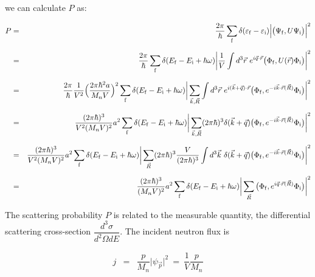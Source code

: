 \documentclass[a4j]{jsarticle}
\begin{document}
we can calculate $P$ as:

\begin{eqnarray}
	P
	&=&
	\dfrac{2 \pi}{\hbar}
	\sum_{\rm f}
	\delta( \varepsilon_{\rm f} - \varepsilon_{\rm i} )
	\Big| \big( \Psi_{\rm f} , U \Psi_{\rm i} \big) \Big|^{2}
	\nonumber \\[2mm] &=&
	\dfrac{2 \pi}{\hbar}
	\sum_{\rm f}
	\delta( E_{\rm f} - E_{\rm i} + \hbar \omega )
	\bigg|
	\dfrac{1}{V} \int d^{3} \vec{r} \
	e^{i \vec{q} \cdot \vec{r}}
	\big( \Phi_{\rm f} , U(\vec{r}) \Phi_{\rm i} \big)
	\bigg|^{2}
	\nonumber \\[2mm] &=&
	\dfrac{2 \pi}{\hbar}
	\dfrac{1}{V^{2}}
	\Big( \dfrac{2 \pi \hbar^{2} a}{M_{n} V} \Big)^{2}
	\sum_{\rm f}
	\delta( E_{\rm f} - E_{\rm i} + \hbar \omega )
	\bigg|
	\sum_{ \vec{k} , \vec{R} }
	\int d^{3} \vec{r} \
	e^{i (\vec{k} + \vec{q} ) \cdot \vec{r}}
	\big( \Phi_{\rm f} ,
	e^{ - i \vec{k} \cdot \vec{r}(\vec{R}) }
	\Phi_{\rm i} \big)
	\bigg|^{2}
	\nonumber \\[2mm] &=&
	\dfrac{ ( 2 \pi \hbar )^{3} }{ V^{2} ( M_{n} V )^{2} } a^{2}
	\sum_{\rm f}
	\delta( E_{\rm f} - E_{\rm i} + \hbar \omega )
	\bigg|
	\sum_{ \vec{k},\vec{R} }
	( 2 \pi \hbar )^{3}
	\delta (\vec{k} + \vec{q} )
	\big( \Phi_{\rm f} ,
	e^{ - i \vec{k} \cdot \vec{r}(\vec{R}) }
	\Phi_{\rm i} \big)
	\bigg|^{2}
	\nonumber \\[2mm] &=&
	\dfrac{ ( 2 \pi \hbar )^{3} }{ V^{2} ( M_{n} V )^{2} } a^{2}
	\sum_{\rm f}
	\delta( E_{\rm f} - E_{\rm i} + \hbar \omega )
	\bigg|
	\sum_{ \vec{R} }
	( 2 \pi \hbar )^{3}
	\dfrac{V}{( 2 \pi \hbar )^{3}}
	\int d^{3} \vec{k} \
	\delta (\vec{k} + \vec{q} )
	\big( \Phi_{\rm f} ,
	e^{ - i \vec{k} \cdot \vec{r}(\vec{R}) }
	\Phi_{\rm i} \big)
	\bigg|^{2}
	\nonumber \\[2mm] &=&
	\dfrac{ ( 2 \pi \hbar )^{3} }{ ( M_{n} V )^{2} }
	a^{2}
	\sum_{\rm f}
	\delta( E_{\rm f} - E_{\rm i} + \hbar \omega )
	\bigg|
	\sum_{\vec{R}}
	\big( \Phi_{\rm f} , e^{i \vec{q} \cdot \vec{r}(\vec{R})} \Phi_{\rm i} \big)
	\bigg|^{2}
\end{eqnarray}

The scattering probability $P$ is related to the measurable quantity, the differential scattering cross-section
$\dfrac{d^{3} \sigma}{d^{2} \Omega d E}$.
The incident neutron flux is

\begin{eqnarray}
	j
	&=&
	\dfrac{p}{M_{n}} \big| \psi_{\vec{p}} \big|^{2}
	\ = \
	\dfrac{1}{V}
	\dfrac{p}{M_{n}}
\end{eqnarray}
\end{document}
